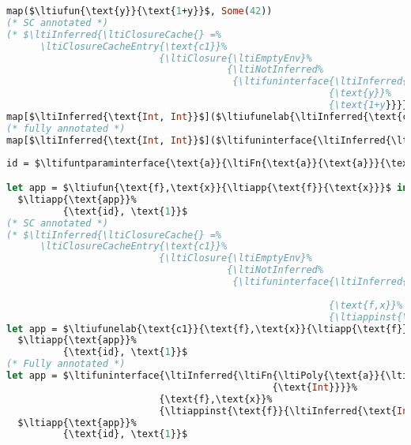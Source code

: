 {
\singlespacing
\begin{lstlisting}[language=ml,mathescape=true]
map($\ltiufun{\text{y}}{\text{1+y}}$, Some(42))
(* SC annotated *)
(* $\ltiInferred{\ltiClosureCache{} =%
      \ltiClosureCacheEntry{\text{c1}}%
                           {\ltiClosure{\ltiEmptyEnv}%
                                       {\ltiNotInferred%
                                        {\ltifuninterface{\ltiInferred{\ltiFn{\text{Int}}{\text{Int}}}}%
                                                         {\text{y}}%
                                                         {\text{1+y}}}}}}$ *)
map[$\ltiInferred{\text{Int, Int}}$]($\ltiufunelab{\ltiInferred{\text{c1}}}{\text{y}}{\text{1+y}}$, Some[$\ltiInferred{\text{Int}}$](42))
(* fully annotated *)
map[$\ltiInferred{\text{Int, Int}}$]($\ltifuninterface{\ltiInferred{\ltiFn{\text{Int}}{\text{Int}}}}{\text{y}}{\text{1+y}}$, Some[$\ltiInferred{\text{Int}}$](42))
\end{lstlisting}
}



{
\singlespacing
\begin{lstlisting}[language=ml,mathescape=true]
id = $\ltifuntparaminterface{\text{a}}{\ltiFn{\text{a}}{\text{a}}}{\text{x}}{\text{x}}$

let app = $\ltiufun{\text{f},\text{x}}{\ltiapp{\text{f}}{\text{x}}}$ in
  $\ltiapp{\text{app}}%
          {\text{id}, \text{1}}$
(* SC annotated *)
(* $\ltiInferred{\ltiClosureCache{} =%
      \ltiClosureCacheEntry{\text{c1}}%
                           {\ltiClosure{\ltiEmptyEnv}%
                                       {\ltiNotInferred%
                                        {\ltifuninterface{\ltiInferred{\ltiFn{\ltiPoly{\text{a}}{\ltiFn{\text{a}}{\text{a}}},\text{Int}}%
                                                                             {\text{Int}}}}%
                                                         {\text{f,x}}%
                                                         {\ltiappinst{\text{f}}{\ltiInferred{\text{Int}}}{\text{x}}}}}}}$ *)
let app = $\ltiufunelab{\text{c1}}{\text{f},\text{x}}{\ltiapp{\text{f}}{\text{x}}}$ in
  $\ltiapp{\text{app}}%
          {\text{id}, \text{1}}$
(* Fully annotated *)
let app = $\ltifuninterface{\ltiInferred{\ltiFn{\ltiPoly{\text{a}}{\ltiFn{\text{a}}{\text{a}}},\text{Int}}%
                                               {\text{Int}}}}%
                           {\text{f},\text{x}}%
                           {\ltiappinst{\text{f}}{\ltiInferred{\text{Int}}}{\text{x}}}$ in
  $\ltiapp{\text{app}}%
          {\text{id}, \text{1}}$
\end{lstlisting}
}

